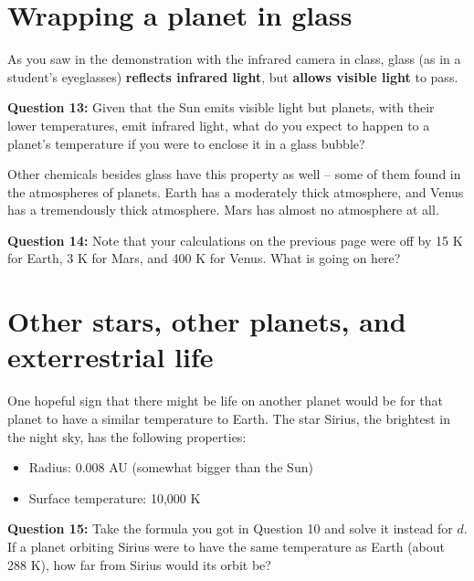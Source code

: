 \documentclass[11pt]{article}
\def\BI{\begin{itemize}}
\def\EI{\end{itemize}}
\begin{document}
\vspace{1.5in}
\hrulefill



\section*{Wrapping a planet in glass}

As you saw in the demonstration with the infrared camera in class, glass (as in a student's eyeglasses) {\bf reflects infrared light}, but {\bf allows visible light} to pass.

{\bf Question 13:} 
Given that the Sun emits visible light but planets, with their lower temperatures, emit infrared light, what do you expect to happen to a planet's temperature if you were to
enclose it in a glass bubble? 

\vspace{1.5in}
\hrulefill
\bigskip

Other chemicals besides glass have this property as well -- some of them found in the atmospheres of planets. Earth has a moderately thick atmosphere, and Venus has a tremendously thick
atmosphere. Mars has almost no atmosphere at all.

{\bf Question 14:}  Note that your calculations on the previous page were off by 15 K for Earth, 3 K for Mars, and 400 K for Venus. 
What is going on here? 

\vspace{1.8in}
\hrulefill
\bigskip


\newpage
\section*{Other stars, other planets, and exterrestrial life}

One hopeful sign that there might be life on another planet would be for that planet to have a similar temperature to Earth. The star Sirius, the brightest in the night sky, 
has the following properties:

\BI
\item Radius: 0.008 AU (somewhat bigger than the Sun)
\item Surface temperature: 10,000 K
\EI

{\bf Question 15:} Take the formula you got in Question 10 and solve it instead for $d$. If a planet orbiting Sirius were to have the same temperature as Earth (about 288 K), 
how far from Sirius would its orbit be?

\newpage
\end{document}
